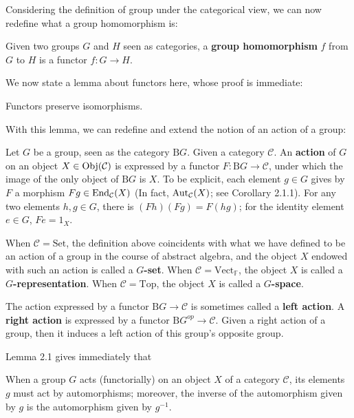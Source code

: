 \par Considering the definition of group under the categorical view, we can now redefine what a group homomorphism is:
	\begin{definition}
	Given two groups $G$ and $H$ seen as categories, a \textbf{group homomorphism} $f$ from $G$ to $H$ is a functor $f:G\to H$.
	\end{definition}
	We now state a lemma about functors here, whose proof is immediate:
	\begin{lemma}
	Functors preserve isomorphisms.
	\end{lemma}
	With this lemma, we can redefine and extend the notion of an action of a group:
	\begin{definition}[Action]
	Let $G$ be a group, seen as the category $\mathrm{B}G$. Given a category $\mathcal{C}$. An \textbf{action} of $G$ on an object $X\in\operatorname{Obj}(\mathcal{C})$ is expressed by a functor $F:\mathrm{B}G\to \mathcal{C}$, under which the image of the only object of $\mathrm{B}G$ is $X$. To be explicit, each element $g\in G$ gives by $F$ a morphism $Fg\in\operatorname{End}_\mathcal{C}(X)$ (In fact, $\operatorname{Aut}_\mathcal{C}(X)$; see Corollary 2.1.1). For any two elements $h,g\in G$, there is $(Fh)(Fg)=F(hg)$; for the identity element $e\in G$, $Fe=1_X$.\par
	When $\mathcal{C}=\mathrm{Set}$, the definition above coincidents with what we have defined to be an action of a group in the course of abstract algebra, and the object $X$ endowed with such an action is called a $G$\textbf{-set}. When $\mathcal{C}=\mathrm{Vect}_\mathbb{F}$, the object $X$ is called a $G$\textbf{-representation}. When $\mathcal{C}=\mathrm{Top}$, the object $X$ is called a $G$\textbf{-space}.\par
	The action expressed by a functor $\mathrm{B}G\to \mathcal{C}$ is sometimes called a \textbf{left action}. A \textbf{right action} is expressed by a functor $\mathrm{B}G^{op}\to \mathcal{C}$. Given a right action of a group, then it induces a left action of this group's opposite group.
	\end{definition}
	Lemma 2.1 gives immediately that
	\begin{corollary}
	When a group $G$ acts (functorially) on an object $X$ of a category $\mathcal{C}$, its elements $g$ must act by automorphisms; moreover, the inverse of the automorphism given by $g$ is the automorphism given by $g^{-1}$.
	\end{corollary}
